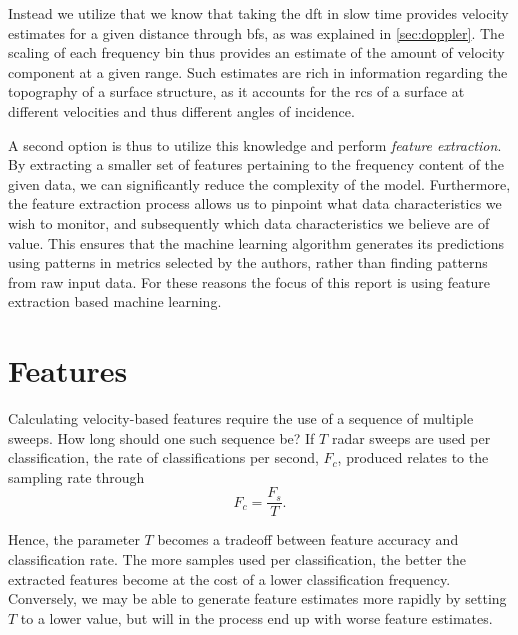 Instead we utilize that we know that taking the \gls{dft} in slow time provides velocity estimates for a given distance through \gls{bf}s, as was explained in \ref{sec:doppler}. The scaling of each frequency bin thus provides an estimate of the amount of velocity component at a given range. Such estimates are rich in information regarding the topography of a surface structure, as it accounts for the \gls{rcs} of a surface at different velocities and thus different angles of incidence. 

A second option is thus to utilize this knowledge and perform \emph{feature extraction}. By extracting a smaller set of features pertaining to the frequency content of the given data, we can significantly reduce the complexity of the model. Furthermore, the feature extraction process allows us to pinpoint what data characteristics we wish to monitor, and subsequently which data characteristics we believe are of value. This ensures that the machine learning algorithm generates its predictions using patterns in metrics selected by the authors, rather than finding patterns from raw input data. For these reasons the focus of this report is using feature extraction based machine learning. 

\section{Features}

Calculating velocity-based features require the use of a sequence of multiple sweeps. How long should one such sequence be? If $T$ radar sweeps are used per classification, the rate of classifications per second, $F_c$, produced relates to the sampling rate through
\begin{equation}
	\label{eq:classification_rate}
	F_c = \frac{F_s}{T}.
\end{equation} 

Hence, the parameter $T$ becomes a tradeoff between feature accuracy and classification rate. The more samples used per classification, the better the extracted features become at the cost of a lower classification frequency. Conversely, we may be able to generate feature estimates more rapidly by setting $T$ to a lower value, but will in the process end up with worse feature estimates. 


